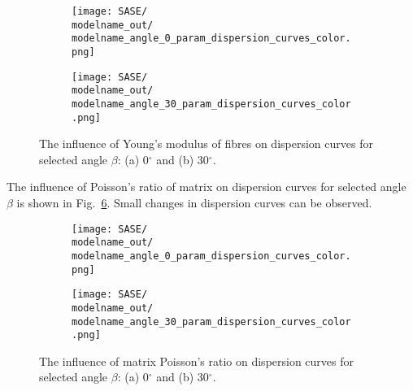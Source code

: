 \documentclass[preprint,12pt]{elsarticle}
\begin{document}
\begin{figure} [h!]
	\centering
	\newcommand{\modelname}{SASE5_plain_weave}
	\begin{subfigure}[b]{0.49\textwidth}
		\centering
		
		
\texttt{[image: SASE/\\modelname\_out/\\modelname\_angle\_0\_param\_dispersion\_curves\_color.png]}
		\caption{}
		\label{fig:ef0}
	\end{subfigure}
	\hfill
	\begin{subfigure}[b]{0.49\textwidth}
		\centering
		
		
\texttt{[image: SASE/\\modelname\_out/\\modelname\_angle\_30\_param\_dispersion\_curves\_color.png]}
		\caption{}
		\label{fig:ef30}
	\end{subfigure}

		\caption{The influence of Young's modulus of fibres on dispersion curves for 
		selected angle \(\beta\): (a) 0\(^{\circ}\) and (b) 30\(^{\circ}\).} 
	\label{fig:ef}
\end{figure}

The influence of  Poisson's ratio of matrix on dispersion curves for selected angle 
\(\beta\) is shown in Fig.~\ref{fig:nim}. Small changes in dispersion curves can be 
observed.

\begin{figure} [h!]
	\centering
	\newcommand{\modelname}{SASE6_plain_weave}
	\begin{subfigure}[b]{0.49\textwidth}
		\centering
		
		
\texttt{[image: SASE/\\modelname\_out/\\modelname\_angle\_0\_param\_dispersion\_curves\_color.png]}
		\caption{}
		\label{fig:nim0}
	\end{subfigure}
	\hfill
	\begin{subfigure}[b]{0.49\textwidth}
		\centering
		
		
\texttt{[image: SASE/\\modelname\_out/\\modelname\_angle\_30\_param\_dispersion\_curves\_color.png]}
		\caption{}
		\label{fig:nim30}
	\end{subfigure}

	\caption{The influence of matrix Poisson's ratio on dispersion curves for selected 
	angle \(\beta\): (a) 0\(^{\circ}\) and (b) 30\(^{\circ}\).}
	\label{fig:nim}
\end{figure}
\end{document}
